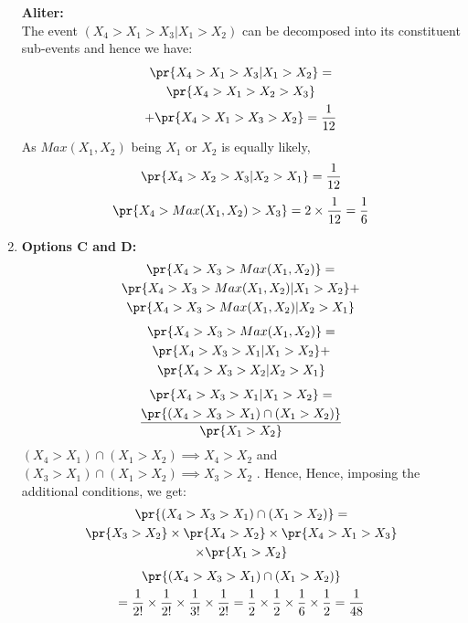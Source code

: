 \begin{enumerate}
\textbf{Aliter:}\\
The event $(X_4 > X_1 > X_3 | X_1 > X_2)$ can be decomposed into its constituent sub-events and hence we have:
\begin{multline}
    \pr{X_4 > X_1 > X_3 | X_1 > X_2 } = \\\pr{X_4 > X_1 > X_2> X_3} \\+\pr{X_4 > X_1 > X_3 > X_2}
= \frac{1}{12}
\end{multline}
As $Max(X_1,X_2)$ being $X_1$ or $X_2$ is equally likely,
\begin{align}
\pr{X_4 > X_2 > X_3| X_2 > X_1} = \frac{1}{12}
\end{align}
\begin{align}
\pr{X_4 > Max(X_1,X_2) > X_3} = 2 \times \frac{1}{12} = \frac{1}{6}
\end{align}
\item \textbf{Options C and D:} 
\begin{multline}
    \pr{X_4 > X_3 > Max(X_1,X_2)} = \\\pr{X_4 > X_3 > Max(X_1,X_2)| X_1>X_2} + \\\pr{X_4 > X_3 > Max(X_1,X_2)| X_2>X_1}
\end{multline}
\begin{multline}
    \pr{X_4 > X_3 > Max(X_1,X_2)} = \\\pr{X_4 > X_3 > X_1| X_1>X_2} + \\\pr{X_4 > X_3 > X_2| X_2>X_1}
\end{multline}
\begin{multline}
    \pr{X_4 > X_3 > X_1 | X_1 > X_2 } = \\ \frac{\pr{(X_4 > X_3 > X_1) \cap (X_1 > X_2) }}{\pr{X_1>X_2}} \label{indep/6/defn_CD}
\end{multline}
 $(X_4>X_1) \cap (X_1>X_2) \implies X_4>X_2$ and $(X_3>X_1) \cap (X_1>X_2) \implies X_3>X_2$ . Hence, Hence, imposing the additional conditions, we get:
\begin{multline}
    \pr{(X_4 > X_3 > X_1) \cap (X_1 > X_2)} = \\\pr{X_3>X_2} \times \pr{X_4>X_2} \times \pr{X_4 > X_1 > X_3} \\\times \pr{X_1 > X_2}
\end{multline}
\begin{multline}
 \pr{(X_4 > X_3 > X_1) \cap (X_1 > X_2)}\\
    = \frac{1}{2!}\times \frac{1}{2!}\times \frac{1}{3!}\times \frac{1}{2!}
    = \frac{1}{2}\times \frac{1}{2}\times \frac{1}{6}\times \frac{1}{2}= \frac{1}{48} \label{indep/6/NR_CD}

\end{multline}
\end{enumerate}
